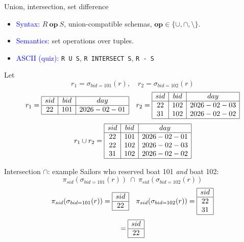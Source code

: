 \documentclass[10pt,aspectratio=169]{beamer}
\newcommand{\select}{\sigma}
\newcommand{\proj}{\pi}
\begin{document}
\begin{frame}{Union, intersection, set difference}
\begin{itemize}
  \item \textcolor{blue}{Syntax:} \(R \ \textbf{op}\ S\), union-compatible schemas,
        \(\textbf{op}\in\{\cup,\cap,\setminus\}\).
  \item \textcolor{blue}{Semantics:} set operations over tuples.
  \item \textcolor{blue}{ASCII (quiz):}
        \texttt{R U S}, \texttt{R INTERSECT S}, \texttt{R - S}
\end{itemize}

\vspace{0.4em}
\small
Let
\[
r_1=\select_{bid=101}(r),\quad r_2=\select_{bid=102}(r)
\]
\[
r_1=\begin{array}{|c|c|c|}\hline
sid&bid&day\\\hline
22&101&2026-02-01\\\hline
\end{array}
\quad
r_2=\begin{array}{|c|c|c|}\hline
sid&bid&day\\\hline
22&102&2026-02-03\\
31&102&2026-02-02\\\hline
\end{array}
\]
\[
r_1\cup r_2=
\begin{array}{|c|c|c|}\hline
sid&bid&day\\\hline
22&101&2026-02-01\\
22&102&2026-02-03\\
31&102&2026-02-02\\\hline
\end{array}
\]
\end{frame}

\begin{frame}{Intersection \(\cap\): example}
\small
Sailors who reserved boat 101 \emph{and} boat 102:
\[
\proj_{sid}(\select_{bid=101}(r))\ \cap\ \proj_{sid}(\select_{bid=102}(r))
\]
\[
\proj_{sid}(\select_{bid=101}(r))=\begin{array}{|c|}\hline sid\\\hline 22\\\hline\end{array}
\quad
\proj_{sid}(\select_{bid=102}(r))=\begin{array}{|c|}\hline sid\\\hline 22\\31\\\hline\end{array}
\]
\[
=\begin{array}{|c|}\hline sid\\\hline 22\\\hline\end{array}
\]
\end{frame}
\end{document}
